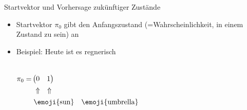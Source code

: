 \begin{frame}{Startvektor und Vorhersage zukünftiger Zustände}
    \small
    \begin{itemize}
        \item<1-> Startvektor $\pi_0$ gibt den Anfangszustand (=Wahrscheinlichkeit, in einem Zustand zu sein) an
        \item<2-> Beispiel: Heute ist es regnerisch
              \begin{columns}
                  \[
                      \begin{aligned}
                          \pi_0 =
                           & \begin{pmatrix}
                                 0 & 1
                             \end{pmatrix}                                                     \\
                           & \begin{matrix}
                                 \;\; \Uparrow & \Uparrow
                             \end{matrix}                                           \\
                           & \begin{matrix}
                                 \; \text{\emoji{sun}} & \text{\emoji{umbrella}}
                             \end{matrix}
                      \end{aligned}
                  \]
\end{columns}
\end{itemize}
\end{frame}

